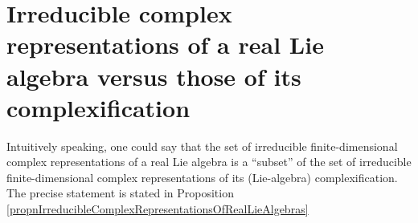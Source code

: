 

\section{Irreducible complex representations of a real Lie algebra versus those of its complexification}
\setcounter{theorem}{0}
\setcounter{equation}{0}


\renewcommand{\theenumi}{\roman{enumi}}
\renewcommand{\labelenumi}{\textnormal{(\theenumi)}$\;\;$}


\vskip 0.3cm
\begin{remark}
\mbox{}
\vskip 0.05cm
\noindent
Intuitively speaking, one could say that
the set of irreducible finite-dimensional {\color{red}complex representations} of a {\color{red}real Lie algebra}
is a ``subset'' of 
the set of irreducible finite-dimensional complex representations of its (Lie-algebra) {\color{red}complexification}.
The precise statement is stated in
Proposition \ref{propnIrreducibleComplexRepresentationsOfRealLieAlgebras}
\end{remark}



